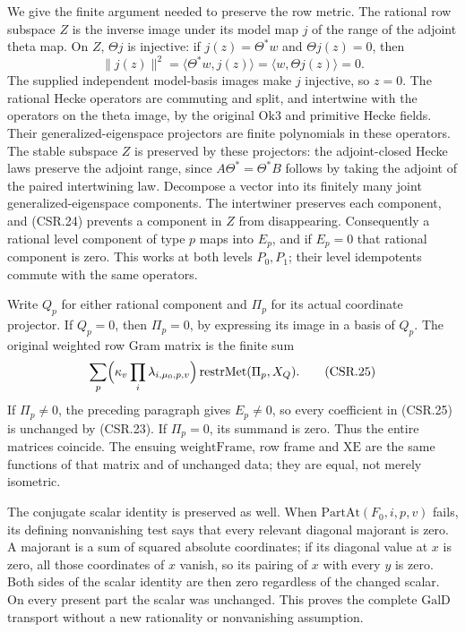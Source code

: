 We give the finite argument needed to preserve the row metric.
The rational row subspace \(Z\) is the inverse image under its
model map \(j\) of the range of the adjoint theta map.
On \(Z\), \(\Theta j\) is injective: if \(j(z)=\Theta^*w\)
and \(\Theta j(z)=0\), then
\[
       \|j(z)\|^2=\langle\Theta^*w,j(z)\rangle
                      =\langle w,\Theta j(z)\rangle=0.
 \tag{CSR.24}
\]
The supplied independent model-basis images make \(j\) injective,
so \(z=0\). The rational Hecke operators are commuting and split,
and intertwine with the operators on the theta image, by the
original \(\mathrm{Ok3}\) and primitive Hecke fields. Their
generalized-eigenspace projectors are finite polynomials in these operators.
The stable subspace \(Z\) is preserved by these projectors:
the adjoint-closed Hecke laws preserve the adjoint range, since
\(A\Theta^*=\Theta^*B\) follows by taking the adjoint of the
paired intertwining law. Decompose a vector into its finitely
many joint generalized-eigenspace components. The intertwiner preserves
each component, and (CSR.24) prevents a component in \(Z\)
from disappearing. Consequently a rational level component
of type \(p\) maps into \(E_p\), and if \(E_p=0\) that
rational component is zero. This works at both levels \(P_0,P_1\);
their level idempotents commute with the same operators.

Write \(Q_p\) for either rational component and \(\Pi_p\) for
its actual coordinate projector. If \(Q_p=0\), then
\(\Pi_p=0\), by expressing its image in a basis of \(Q_p\).
The original weighted row Gram matrix is the finite sum
\[
        \sum_p\Bigl(\kappa_v\prod_i\lambda_{i,\mu_0,p,v}\Bigr)
                           \operatorname{restrMet}(\Pi_p,X_Q).
 \tag{CSR.25}
\]
If \(\Pi_p\ne0\), the preceding paragraph gives \(E_p\ne0\),
so every coefficient in (CSR.25) is unchanged by (CSR.23).
If \(\Pi_p=0\), its summand is zero. Thus the entire matrices
coincide. The ensuing \(\mathrm{weightFrame}\), row frame and
\(\mathrm{XE}\) are the same functions of that matrix and of
unchanged data; they are equal, not merely isometric.

The conjugate scalar identity is preserved as well. When
\(\mathrm{PartAt}(F_0,i,p,v)\) fails, its defining nonvanishing
test says that every relevant diagonal majorant is zero.
A majorant is a sum of squared absolute coordinates; if its
diagonal value at \(x\) is zero, all those coordinates of \(x\)
vanish, so its pairing of \(x\) with every \(y\) is zero.
Both sides of the scalar identity are then zero regardless of
the changed scalar. On every present part the scalar was
unchanged. This proves the complete \(\mathrm{GalD}\) transport
without a new rationality or nonvanishing assumption.


